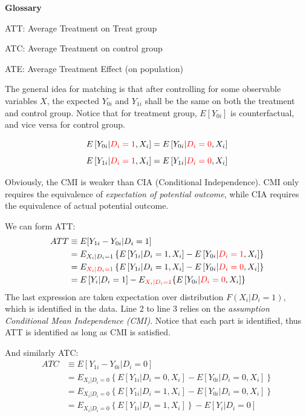 \textbf{Glossary}

ATT: Average Treatment on Treat group

ATC: Average Treatment on control group

ATE: Average Treatment Effect (on population)

The general idea for matching is that after controlling for some observable variables $X$, the expected $Y_{0i}$ and $Y_{1i}$ shall be the same on both the treatment and control group. Notice that for treatment group, $E[Y_{0i}]$ is counterfactual, and vice versa for control group.

\begin{assp}
    \[E\left[Y_{0i}|{\color{red} D_i=1},X_i\right] = E\left[Y_{0i}|{\color{red} D_i=0},X_i\right]\]
    \[E\left[Y_{1i}|{\color{red} D_i=1},X_i\right] = E\left[Y_{1i}|{\color{red} D_i=0},X_i\right]\]
\end{assp}
Obviously, the CMI is weaker than CIA (Conditional Independence).
CMI only requires the equivalence of \textit{expectation of potential outcome}, while CIA requires the equivalence of actual potential outcome. 


We can form ATT:
\begin{align*}
    ATT &\equiv E[Y_{1i}-Y_{0i} | D_i = 1] \\
    &= E_{X_i|D_i=1} \left\{ E\left[Y_{1i}|D_i=1,X_i\right] - E\left[Y_{0i}|{\color{red} D_i=1},X_i\right]  \right\}\\
    &= E_{{\color{red} X_i|D_i=1}} \left\{ E\left[Y_{1i}|D_i=1,X_i\right] - E\left[Y_{0i}|{\color{red} D_i=0},X_i\right]  \right\} \\
    &= E\left[Y_i|D_i=1\right] - E_{{\color{red} X_i|D_i=1}} \{E\left[Y_{0i}|{\color{red} D_i=0},X_i\right] \}
\end{align*}
The last expression are taken expectation over distribution $F(X_i|D_i=1)$, which is identified in the data.
Line 2 to line 3 relies on the \textit{assumption Conditional Mean Independence (CMI)}.
Notice that each part is identified,
thus ATT is identified as long as CMI is satisfied.


And similarly ATC:
\begin{align*}
    ATC &\equiv E[Y_{1i}-Y_{0i} | D_i = 0] \\
    &= E_{X_i|D_i=0} \left\{ E\left[Y_{1i}|D_i=0,X_i\right] - E\left[Y_{0i}|D_i=0,X_i\right]  \right\}\\
    &= E_{X_i|D_i=0} \left\{ E\left[Y_{1i}|D_i=1,X_i\right] - E\left[Y_{0i}|D_i=0,X_i\right]  \right\}\\
    &=  E_{X_i|D_i=0} \left\{ E\left[Y_{1i}|D_i=1,X_i\right] \right\} - E[Y_i|D_i=0]
\end{align*}

